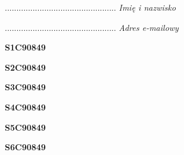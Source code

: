 \begin{turn}{90}\begin{minipage}{\linewidth} \vspace{20mm} ................................................  \textit{Imię i nazwisko}\end{minipage}\end{turn}

\begin{turn}{90}\begin{minipage}{\linewidth} \vspace{20mm} ................................................  \textit{Adres e-mailowy}\end{minipage}\end{turn}

\begin{turn}{90}\huge \begin{minipage}{\linewidth} \vspace{10mm}\textbf{S1C90849}\end{minipage}\end{turn}

\begin{turn}{90}\huge \begin{minipage}{\linewidth} \vspace{10mm}\textbf{S2C90849}\end{minipage}\end{turn}

\begin{turn}{90}\huge \begin{minipage}{\linewidth} \vspace{10mm}\textbf{S3C90849}\end{minipage}\end{turn}

\begin{turn}{90}\huge \begin{minipage}{\linewidth} \vspace{10mm}\textbf{S4C90849}\end{minipage}\end{turn}

\begin{turn}{90}\huge \begin{minipage}{\linewidth} \vspace{10mm}\textbf{S5C90849}\end{minipage}\end{turn}

\begin{turn}{90}\huge \begin{minipage}{\linewidth} \vspace{10mm}\textbf{S6C90849}\end{minipage}\end{turn}

